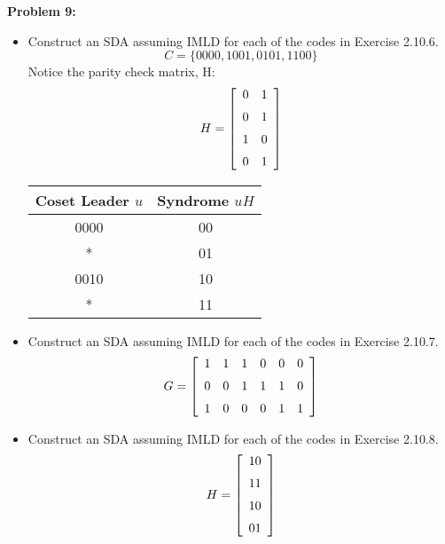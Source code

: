 \documentclass[11pt]{article}
\newenvironment{problem}[1]{\textbf{Problem #1: }}{\newpage}
\begin{document}
	\begin{problem}{9}
		\begin{itemize}
			\item[2.11.8] Construct an SDA assuming IMLD for each of the codes in Exercise 2.10.6.
			\[C = \{0000, 1001, 0101, 1100\}\]
			Notice the parity check matrix, H:
			\[H =  \left[ \begin {array}{cc} 0&1\\ \noalign{\medskip}0&1
			\\ \noalign{\medskip}1&0\\ \noalign{\medskip}0&1\end {array} \right]
			\]
			\begin{tabular}{c|c}
				Coset Leader $u$ & Syndrome $uH$ \\
				\hline
				0000 & 00 \\
				* & 01 \\
				0010 & 10 \\
				* & 11
				\end{tabular}
			
			\item[2.11.9] Construct an SDA assuming IMLD for each of the codes in Exercise 2.10.7.
			\[G = \left[\begin{array}{cccccc}
				1&1&1&0&0&0 \\
				\noalign{\medskip} 0&0&1&1&1&0 \\
				\noalign{\medskip} 1&0&0&0&1&1 \\
			\end{array}\right]\]
			\item[2.11.10] Construct an SDA assuming IMLD for each of the codes in Exercise 2.10.8. 
			\[H = \left[\begin{array}{cc}
				10 \\
				\noalign{\medskip} 11 \\
				\noalign{\medskip} 10 \\
				\noalign{\medskip} 01 \\
			\end{array}\right]\]
		\end{itemize}
	\end{problem}
\end{document}
